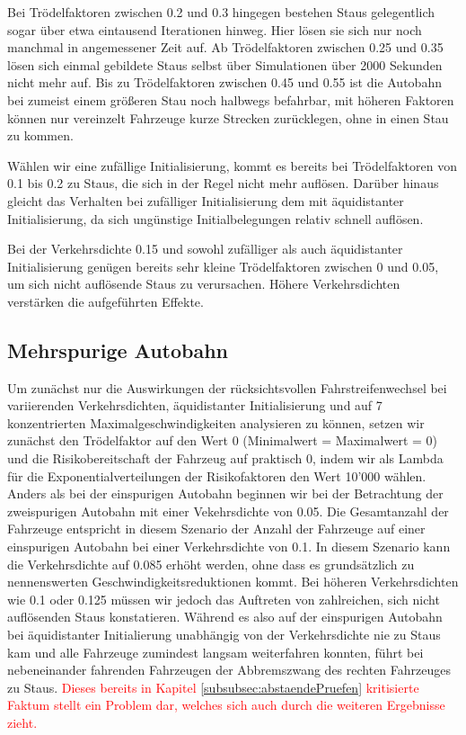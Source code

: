 \documentclass[10pt, a4paper]{article}
\begin{document}
Bei Trödelfaktoren zwischen 0.2 und 0.3 hingegen bestehen Staus gelegentlich sogar über etwa eintausend Iterationen hinweg. Hier lösen sie sich nur noch manchmal in angemessener Zeit auf. Ab Trödelfaktoren zwischen 0.25 und 0.35 lösen sich einmal gebildete Staus selbst über Simulationen über 2000 Sekunden nicht mehr auf. Bis zu Trödelfaktoren zwischen 0.45 und 0.55 ist die Autobahn bei zumeist einem größeren Stau noch halbwegs befahrbar, mit höheren Faktoren können nur vereinzelt Fahrzeuge kurze Strecken zurücklegen, ohne in einen Stau zu kommen.

Wählen wir eine zufällige Initialisierung, kommt es bereits bei Trödelfaktoren von 0.1 bis 0.2 zu Staus, die sich in der Regel nicht mehr auflösen. Darüber hinaus gleicht das Verhalten bei zufälliger Initialisierung dem mit äquidistanter Initialisierung, da sich ungünstige Initialbelegungen relativ schnell auflösen.

Bei der Verkehrsdichte 0.15 und sowohl zufälliger als auch äquidistanter Initialisierung genügen bereits sehr kleine Trödelfaktoren zwischen 0 und 0.05, um sich nicht auflösende Staus zu verursachen. Höhere Verkehrsdichten verstärken die aufgeführten Effekte.

\subsection{Mehrspurige Autobahn}
\label{subsec:mehrspurig}

Um zunächst nur die Auswirkungen der rücksichtsvollen Fahrstreifenwechsel bei variierenden Verkehrsdichten, äquidistanter Initialisierung und auf 7 konzentrierten Maximalgeschwindigkeiten analysieren zu können, setzen wir zunächst den Trödelfaktor auf den Wert 0 (Minimalwert = Maximalwert = 0) und die Risikobereitschaft der Fahrzeug auf praktisch 0, indem wir als Lambda für die Exponentialverteilungen der Risikofaktoren den Wert 10'000 wählen.
Anders als bei der einspurigen Autobahn beginnen wir bei der Betrachtung der zweispurigen Autobahn mit einer Vekehrsdichte von 0.05. Die Gesamtanzahl der Fahrzeuge entspricht in diesem Szenario der Anzahl der Fahrzeuge auf einer einspurigen Autobahn bei einer Verkehrsdichte von 0.1.
In diesem Szenario kann die Verkehrsdichte auf 0.085 erhöht werden, ohne dass es grundsätzlich zu nennenswerten Geschwindigkeitsreduktionen kommt. Bei höheren Verkehrsdichten wie 0.1 oder 0.125 müssen wir jedoch das Auftreten von zahlreichen, sich nicht auflösenden Staus konstatieren.
Während es also auf der einspurigen Autobahn bei äquidistanter Initialierung unabhängig von der Verkehrsdichte nie zu Staus kam und alle Fahrzeuge zumindest langsam weiterfahren konnten, führt bei nebeneinander fahrenden Fahrzeugen der Abbremszwang des rechten Fahrzeuges zu Staus. \textcolor{red}{Dieses bereits in Kapitel \ref{subsubsec:abstaendePruefen} kritisierte Faktum stellt ein Problem dar, welches sich auch durch die weiteren Ergebnisse zieht.}
\end{document}
